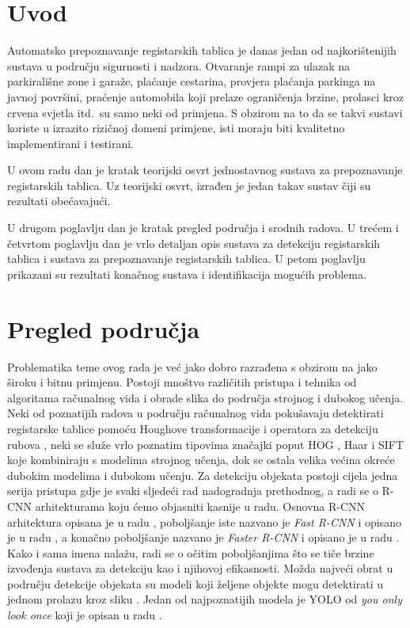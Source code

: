 \documentclass[times, utf8, diplomski]{fer}
\begin{document}
\tableofcontents

\chapter{Uvod}
Automatsko prepoznavanje registarskih tablica  je danas jedan od najkorištenijih sustava u području sigurnosti i nadzora. Otvaranje rampi za ulazak na parkirališne zone i garaže, plaćanje cestarina, provjera plaćanja parkinga na javnoj površini, praćenje automobila koji prelaze ograničenja brzine, prolasci kroz crvena svjetla itd.\ su samo neki od primjena. S obzirom na to da se takvi sustavi koriste u izrazito rizičnoj domeni primjene, isti moraju biti kvalitetno implementirani i testirani.

U ovom radu dan je kratak teorijski osvrt jednostavnog sustava za prepoznavanje registarskih tablica. Uz teorijski osvrt, izrađen je jedan takav sustav čiji su rezultati obećavajući.

\bigskip

U drugom poglavlju dan je kratak pregled područja i srodnih radova. U trećem i četvrtom poglavlju dan je vrlo detaljan opis sustava za detekciju registarskih tablica i sustava za prepoznavanje registarskih tablica. U petom poglavlju prikazani su rezultati konačnog sustava i identifikacija mogućih problema. 


\chapter{Pregled područja}
Problematika teme ovog rada je već jako dobro razrađena s obzirom na jako široku i bitnu primjenu. Postoji mnoštvo različitih pristupa i tehnika od algoritama računalnog vida i obrade slika do područja strojnog i dubokog učenja. Neki od poznatijih radova u području računalnog vida pokušavaju detektirati registarske tablice pomoću Houghove transformacije \citep{hough-paper} i operatora za detekciju rubova \citep{canny-paper}, neki se služe vrlo poznatim tipovima značajki poput HOG \citep{hog-paper}, Haar \citep{haar-paper} i SIFT \citep{sift-paper} koje kombiniraju s modelima strojnog učenja, dok se ostala velika većina okreće dubokim modelima i dubokom učenju. Za detekciju objekata postoji cijela jedna serija pristupa gdje je svaki sljedeći rad nadogradnja prethodnog, a radi se o R-CNN arhitekturama koju ćemo objasniti kasnije u radu. Osnovna R-CNN arhitektura opisana je u radu \citep{rcnn-paper}, poboljšanje iste nazvano je \textit{Fast R-CNN} i opisano je u radu \citep{fast-rcnn-paper}, a konačno poboljšanje nazvano je \textit{Faster R-CNN} i opisano je u radu \citep{faster-rcnn-paper}. Kako i sama imena nalažu, radi se o očitim poboljšanjima što se tiče brzine izvođenja sustava za detekciju kao i njihovoj efikasnosti. Možda najveći obrat u području detekcije objekata su modeli koji željene objekte mogu detektirati u jednom prolazu kroz sliku . Jedan od najpoznatijih modela je YOLO od \textit{you only look once} koji je opisan u radu \citep{yolo-paper}.
\end{document}

